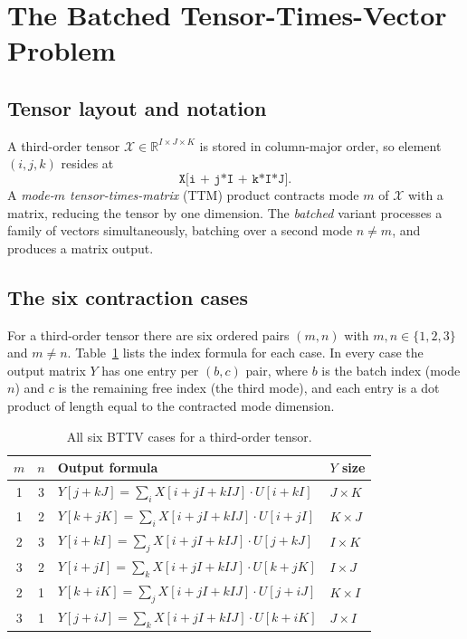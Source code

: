 \documentclass[11pt]{article}
\begin{document}
\section{The Batched Tensor-Times-Vector Problem}

\subsection{Tensor layout and notation}

A third-order tensor $\mathcal{X} \in \mathbb{R}^{I \times J \times K}$
is stored in column-major order, so element $(i,j,k)$ resides at
\[
  \texttt{X[i + j*I + k*I*J]}.
\]
A \emph{mode-$m$ tensor-times-matrix} (TTM) product contracts mode $m$
of $\mathcal{X}$ with a matrix, reducing the tensor by one dimension.
The \emph{batched} variant processes a family of vectors simultaneously,
batching over a second mode $n \neq m$, and produces a matrix output.

\subsection{The six contraction cases}

For a third-order tensor there are six ordered pairs $(m,n)$ with
$m,n \in \{1,2,3\}$ and $m \neq n$.  Table~\ref{tab:cases} lists the
index formula for each case.  In every case the output matrix $Y$ has
one entry per $(b,c)$ pair, where $b$ is the batch index (mode $n$) and
$c$ is the remaining free index (the third mode), and each entry is a
dot product of length equal to the contracted mode dimension.

\begin{table}[h]
\centering
\caption{All six BTTV cases for a third-order tensor.}
\label{tab:cases}
\begin{tabular}{ccll}
\toprule
$m$ & $n$ & Output formula & $Y$ size \\
\midrule
1 & 3 & $Y[j{+}kJ] = \sum_i X[i{+}jI{+}kIJ]\cdot U[i{+}kI]$ & $J\times K$ \\
1 & 2 & $Y[k{+}jK] = \sum_i X[i{+}jI{+}kIJ]\cdot U[i{+}jI]$ & $K\times J$ \\
2 & 3 & $Y[i{+}kI] = \sum_j X[i{+}jI{+}kIJ]\cdot U[j{+}kJ]$ & $I\times K$ \\
3 & 2 & $Y[i{+}jI] = \sum_k X[i{+}jI{+}kIJ]\cdot U[k{+}jK]$ & $I\times J$ \\
2 & 1 & $Y[k{+}iK] = \sum_j X[i{+}jI{+}kIJ]\cdot U[j{+}iJ]$ & $K\times I$ \\
3 & 1 & $Y[j{+}iJ] = \sum_k X[i{+}jI{+}kIJ]\cdot U[k{+}iK]$ & $J\times I$ \\
\bottomrule
\end{tabular}
\end{table}
\end{document}
